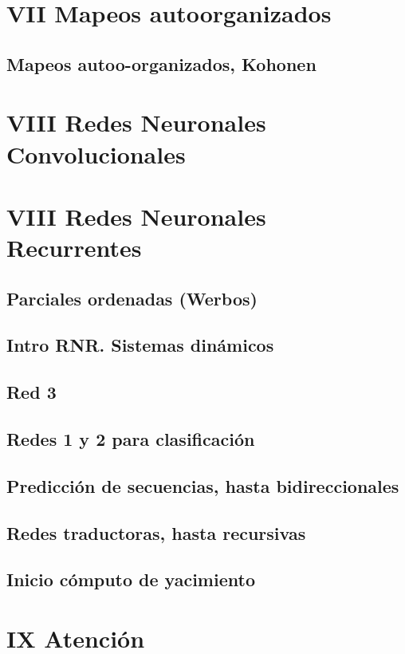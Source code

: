 \documentclass[12pt,openany]{book}
\begin{document}
\chapter{VII Mapeos autoorganizados}%
\section{Mapeos autoo-organizados, Kohonen}

\chapter{VIII Redes Neuronales Convolucionales}%
\section{}

\chapter{VIII Redes Neuronales Recurrentes}%
\section{Parciales ordenadas (Werbos)}
\section{Intro RNR. Sistemas dinámicos}
\section{Red 3}
\section{Redes 1 y 2 para clasificación}
\section{Predicción de secuencias, hasta bidireccionales}
\section{Redes traductoras, hasta recursivas}
\section{Inicio cómputo de yacimiento} %

\chapter{IX Atención}%
\end{document}
